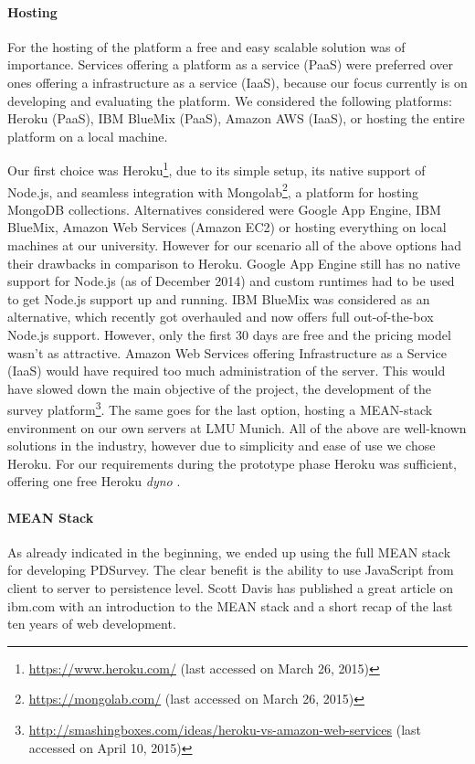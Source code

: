 	\paragraph{Hosting}

		For the hosting of the platform a free and easy scalable solution was of importance. Services offering a platform as a service (PaaS) were preferred over ones offering a infrastructure as a service (IaaS), because our focus currently is on developing and evaluating the platform. We considered the following platforms: Heroku (PaaS), IBM BlueMix (PaaS), Amazon AWS (IaaS), or hosting the entire platform on a local machine.

		Our first choice was Heroku\footnote{\url{https://www.heroku.com/} (last accessed on March 26, 2015)}, due to its simple setup, its native support of Node.js, and seamless integration with Mongolab\footnote{\url{https://mongolab.com/} (last accessed on March 26, 2015)}, a platform for hosting MongoDB collections.
		Alternatives considered were Google App Engine, IBM BlueMix, Amazon Web Services (Amazon EC2) or hosting everything on local machines at our university. However for our scenario all of the above options had their drawbacks in comparison to Heroku. Google App Engine still has no native support for Node.js (as of December 2014) and custom runtimes had to be used to get Node.js support up and running. IBM BlueMix was considered as an alternative, which recently got overhauled and now offers full out-of-the-box Node.js support. However, only the first 30 days are free and the pricing model wasn't as attractive. Amazon Web Services offering Infrastructure as a Service (IaaS) would have required too much administration of the server. This would have slowed down the main objective of the project, the development of the survey platform\footnote{\url{http://smashingboxes.com/ideas/heroku-vs-amazon-web-services} (last accessed on April 10, 2015)}. The same goes for the last option, hosting a MEAN-stack environment on our own servers at LMU Munich. All of the above are well-known solutions in the industry, however due to simplicity and ease of use we chose Heroku. For our requirements during the prototype phase Heroku was sufficient, offering one free Heroku \textit{dyno} \cite{Heroku2014Dyno}.



		\paragraph{MEAN Stack}
		As already indicated in the beginning, we ended up using the full MEAN stack for developing PDSurvey. The clear benefit is the ability to use JavaScript from client to server to persistence level. Scott Davis has published a great article on ibm.com with an introduction to the MEAN stack and a short recap of the last ten years of web development\cite{Scott2014MEANStack}.






